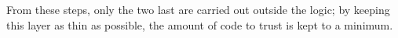 \begin{isabellebody}
\begin{isamarkuptext}
\begin{itemize}
  \end{itemize}

  \noindent From these steps, only the two last are carried out outside the logic;  by
  keeping this layer as thin as possible, the amount of code to trust is
  kept to a minimum.%
\end{isamarkuptext}%
\isamarkuptrue%
%
\isadelimtheory
%
\endisadelimtheory
%
\isatagtheory
{}\isamarkupfalse%
%
\endisatagtheory
{\isafoldtheory}%
%
\isadelimtheory
%
\endisadelimtheory
\isanewline
\end{isabellebody}%
